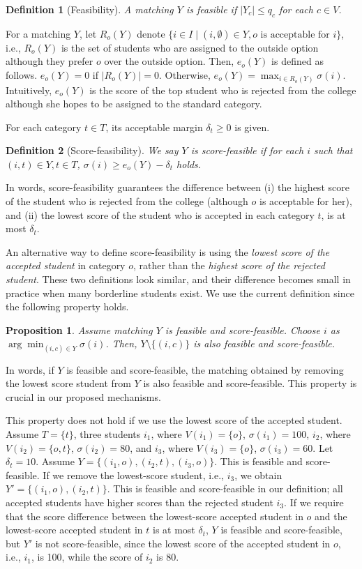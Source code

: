 \documentclass{article}
\newtheorem{definition}{Definition}
\newtheorem{proposition}{Proposition}
\begin{document}
\begin{definition}[Feasibility]
A matching $Y$ is feasible if 
    $|Y_c| \leq q_c$ for each $c \in V$.
\end{definition}
For a matching $Y$, 
let $R_o(Y)$ denote $\{i\in I \mid (i,\emptyset) \in Y, o\text{ is acceptable for }i\}$, 
i.e., $R_o(Y)$ is the set of students who are assigned to the outside option although they prefer
$o$ over the outside option. 
Then, $e_o(Y)$ is defined as follows.
$e_o(Y)=0$ if $|R_o(Y)|=0$. Otherwise, 
$e_o(Y) = \max_{i \in R_o(Y)}\sigma(i)$.
Intuitively, $e_o(Y)$ is the score of the top student who is rejected from the college 
although she hopes to be assigned to the standard category. 

For each category $t\in T$, its 
acceptable margin $\delta_t \geq 0$ is given. 
\begin{definition}[Score-feasibility]
We say $Y$ is score-feasible if for each $i$ such that 
$(i,t) \in Y, t \in T$, $\sigma(i) \ge e_o(Y) - \delta_t$ holds. 
\end{definition}
In words, score-feasibility guarantees the difference between 
(i) the 
highest score of the student who is rejected from the college (although 
$o$ is acceptable for her),
and (ii) the lowest score of the student who is accepted in 
each category $t$, is at most $\delta_t$. 

An alternative way to define score-feasibility is using the 
\emph{lowest score of the accepted student} in category $o$, 
rather than the \emph{highest score of the rejected student}.
These two definitions look similar, and their difference becomes 
small in practice when many borderline students exist. 
We use the current definition since the following property holds. 

\begin{proposition}
    Assume matching $Y$ is feasible and score-feasible. 
    Choose $i$ as $\arg\min_{(i,c)\in Y} \sigma(i)$.
    Then, $Y \setminus \{(i,c)\}$ is also feasible and score-feasible. 
\end{proposition}
In words, if $Y$ is feasible and score-feasible, 
the matching obtained by removing the lowest score student from $Y$ is also 
feasible and score-feasible. This property is crucial in our proposed mechanisms. 

This property does not hold if we use the lowest score of the accepted student.
Assume $T=\{t\}$, three students $i_1$, where $V(i_1)=\{o\}$, $\sigma(i_1)=100$, 
$i_2$, where $V(i_2)=\{o,t\}$, $\sigma(i_2)=80$, 
and $i_3$, where $V(i_3)=\{o\}$, $\sigma(i_3)=60$. Let $\delta_t = 10$. 
Assume $Y=\{(i_1, o), (i_2,t), (i_3, o)\}$. 
This is feasible and score-feasible. 
If we remove the lowest-score student, i.e., $i_3$, 
we obtain $Y'=\{(i_1, o), (i_2,t)\}$. 
This is feasible and score-feasible in our definition; 
all accepted students have higher scores than the rejected student $i_3$. 
If we require that the score difference between the lowest-score accepted student 
in $o$ and the lowest-score accepted student in $t$ is at most $\delta_t$, 
$Y$ is feasible and score-feasible, but $Y'$ is not score-feasible, since 
the lowest score of the accepted student in $o$, i.e., $i_1$, is 100, 
while the score of $i_2$ is 80.
\end{document}
